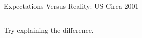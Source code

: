\documentclass[shownotes,11pt, aspectratio=169]{beamer}
\begin{document}
\begin{frame}{Expectations Versus Reality: US Circa 2001}
\begin{columns}[T] %
\begin{column}{.46\textwidth}
\begin{center}
\end{center}
\end{column}
\hfill
\pause
\begin{column}{.46\textwidth}
\begin{center}
\end{center}
\end{column}
\end{columns}
\pause
Try explaining the difference.
\end{frame}
\end{document}
